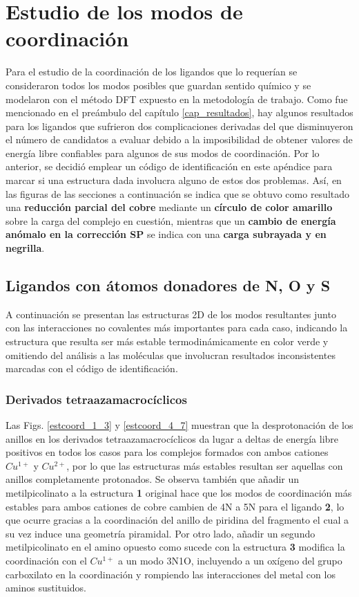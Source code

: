 \chapter{Estudio de los modos de coordinación}\label{ap1}

Para el estudio de la coordinación de los ligandos que lo requerían se consideraron todos los modos posibles que guardan sentido químico y se modelaron con el método DFT expuesto en la metodología de trabajo. Como fue mencionado en el preámbulo del capítulo \ref{cap_resultados}, hay algunos resultados para los ligandos que sufrieron dos complicaciones derivadas del que disminuyeron el número de candidatos a evaluar debido a la imposibilidad de obtener valores de energía libre confiables para algunos de sus modos de coordinación. Por lo anterior, se decidió emplear un código de identificación en este apéndice para marcar si una estructura dada involucra alguno de estos dos problemas. Así, en las figuras de las secciones a continuación se indica que se obtuvo como resultado una \textbf{reducción parcial del cobre} mediante un \textbf{círculo de color amarillo} sobre la carga del complejo en cuestión, mientras que un \textbf{cambio de energía anómalo en la corrección SP} se indica con una \textbf{carga subrayada y en negrilla}. 

\section{Ligandos con átomos donadores de N, O y S}

A continuación se presentan las estructuras 2D de los modos resultantes junto con las interacciones no covalentes más importantes para cada caso, indicando la estructura que resulta ser más estable termodinámicamente en color verde y omitiendo del análisis a las moléculas que involucran resultados inconsistentes marcadas con el código de identificación.

\subsection{Derivados tetraazamacrocíclicos}

Las Figs. \ref{estcoord_1_3} y \ref{estcoord_4_7} muestran que la desprotonación de los anillos en los derivados tetraazamacrocíclicos da lugar a deltas de energía libre positivos en todos los casos para los complejos formados con ambos cationes $Cu^{1+}$ y $Cu^{2+}$, por lo que las estructuras más estables resultan ser aquellas con anillos completamente protonados. Se observa también que añadir un metilpicolinato a la estructura \textbf{1} original hace que los modos de coordinación más estables para ambos cationes de cobre cambien de 4N a 5N para el ligando \textbf{2}, lo que ocurre gracias a la coordinación del anillo de piridina del fragmento el cual a su vez induce una geometría piramidal. Por otro lado, añadir un segundo metilpicolinato en el amino opuesto como sucede con la estructura \textbf{3} modifica la coordinación con el $Cu^{1+}$ a un modo 3N1O, incluyendo a un oxígeno del grupo carboxilato en la coordinación y rompiendo las interacciones del metal con los aminos sustituidos.\\

